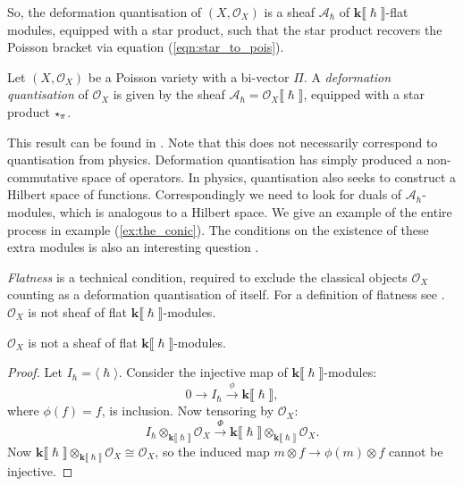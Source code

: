     
    

    So, the deformation quantisation of \( (X,\mathcal{O}_X)\) is a sheaf \( \mathcal{A}_{\hslash}\) of  \( \mathbf{k}\lBrack \hslash\rBrack\)-flat modules, equipped with a star product, such that the star product recovers the Poisson bracket via equation (\ref{eqn:star_to_pois}). 

    \begin{defn} 
    \label{defn:def_quant}
    Let \( (X,\mathcal{O}_X)\) be a Poisson variety with a bi-vector \( \Pi\). A \emph{deformation quantisation} of \( \mathcal{O}_X\) is given by the sheaf \( \mathcal{A}_{\hslash} = \mathcal{O}_X \lBrack \hslash \rBrack \), equipped with a star product \( \starp_{\pi} \).
    \end{defn}
    
    This result can be found in \cite{yekutieli}. Note that this does not necessarily correspond to quantisation from physics. Deformation quantisation has simply produced a non-commutative space of operators. In physics, quantisation also seeks to construct a Hilbert space of functions. Correspondingly we need to look for duals of \( \mathcal{A}_{\hslash}\)-modules, which is analogous to a Hilbert space. We give an example of the entire process in example (\ref{ex:the_conic}). The conditions on the existence of these extra modules is also an interesting question \cite[section 2.4, page 15]{abpolyquant}. 

    \emph{Flatness} is a technical condition, required to exclude the classical objects \( \mathcal{O}_X\) counting as a deformation quantisation of itself. For a definition of flatness see \cite{lang}. \(\mathcal{O}_X\) is not sheaf of flat \( \mathbf{k}\lBrack \hslash \rBrack\)-modules.

    \begin{lem} \( \mathcal{O}_X\) is not a sheaf of flat \( \mathbf{k}\lBrack \hslash \rBrack\)-modules.
    \end{lem}
    \begin{proof}
    Let \( I_{\hslash} = \langle \hslash \rangle \). 
    Consider the injective map of \( \mathbf{k} \lBrack \hslash \rBrack\)-modules:
    \[ 0 \rightarrow  I_{\hslash} \overset{\phi}{\rightarrow} \mathbf{k} \lBrack \hslash \rBrack,\]
    where \( \phi(f)  = f\), is inclusion. Now tensoring by \( \mathcal{O}_X\):
    \[ I_{\hslash} \otimes_{\mathbf{k}\lBrack \hslash \rBrack} \mathcal{O}_X \overset{\Phi}{\rightarrow} \mathbf{k}\lBrack \hslash \rBrack \otimes_{\mathbf{k}\lBrack \hslash \rBrack} \mathcal{O}_X. \]
    Now  \( \mathbf{k}\lBrack \hslash \rBrack \otimes_{\mathbf{k}\lBrack \hslash \rBrack} \mathcal{O}_X \cong \mathcal{O}_X\), so the induced map \( m \otimes f \rightarrow \phi(m) \otimes f \) cannot be injective.  %
    \end{proof}

